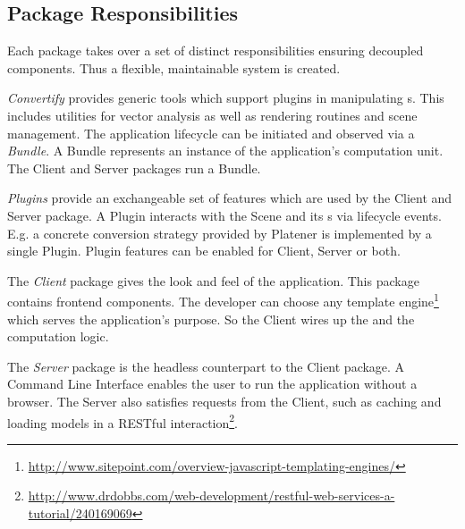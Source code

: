 \documentclass[../ClassicThesis.tex]{subfiles}
\begin{document}

\subsection{Package Responsibilities}

Each package takes over a set of distinct responsibilities ensuring decoupled
components. Thus a flexible, maintainable system is created.

\emph{Convertify} provides generic tools which support plugins in manipulating
{\threedmodel}s. This includes utilities for vector analysis as well as
rendering routines and scene management. The application lifecycle can be
initiated and observed via a \emph{Bundle}. A Bundle represents an instance of
the application's computation unit. The Client and Server packages run a Bundle.

\emph{Plugins} provide an exchangeable set of features which are used by the
Client and Server package. A Plugin interacts with the Scene and its
{\threedmodel}s via lifecycle events. E.g. a concrete conversion strategy
provided by Platener is implemented by a single Plugin. Plugin features can be
enabled for Client, Server or both.

The \emph{Client} package gives the look and feel of the application. This
package contains frontend components. The developer can choose any template
engine\footnote{\url{http://www.sitepoint.com/overview-javascript-templating-engines/}}
which serves the application's purpose. So the Client wires up the
{\userinterface} and the computation logic.

The \emph{Server} package is the headless counterpart to the Client package. A
Command Line Interface enables the user to run the application without a
browser. The Server also satisfies requests from the Client, such as caching and
loading models in a RESTful
interaction\footnote{\url{http://www.drdobbs.com/web-development/restful-web-services-a-tutorial/240169069}}.
\end{document}
